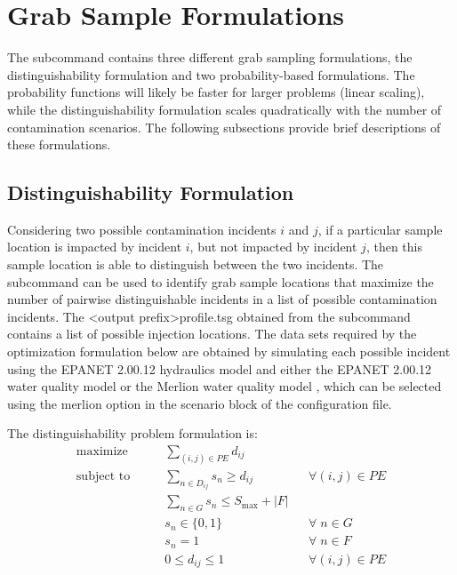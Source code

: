 \section{Grab Sample Formulations}
The  subcommand contains three different grab sampling formulations, 
the distinguishability formulation and two probability-based formulations.
The probability functions will likely be faster for larger problems (linear scaling), while the distinguishability formulation scales quadratically with the number of contamination scenarios. 
The following subsections provide brief descriptions of these formulations.

\subsection{Distinguishability Formulation}
\label{grabsample_formulation}
Considering two possible contamination incidents $i$ and $j$, if a
particular sample location is impacted by incident $i$, but not
impacted by incident $j$, then this sample location is able to
distinguish between the two incidents. The  subcommand
can be used to identify grab sample locations that maximize the number
of pairwise distinguishable incidents in a list of possible
contamination incidents. The <output prefix>profile.tsg obtained
from the  subcommand contains a list of possible injection
locations. The data sets required by the optimization formulation
below are obtained by simulating each possible incident using the
EPANET 2.00.12 hydraulics model and either the EPANET 2.00.12 water quality model or the Merlion water quality model \citep{Mann1},
which can be selected using the merlion option in the scenario block of the configuration file.

The distinguishability problem formulation is:
\begin{align}
\textrm{maximize}\qquad &\sum_{(i,j) \in PE} d_{ij}\label{eqn.grabsample_obj}\\
\textrm{subject to} \qquad &\sum_{n \in D_{ij}}s_n \geq d_{ij} &&\forall \left( i,j \right) \in PE \label{eqn.grabsample_cons1} \\
&\sum_{n \in G}s_n \leq S_{\max} + \left|F\right|\label{eqn.grabsample_cons2} \\
&s_n \in \lbrace 0,1 \rbrace &&\forall \; n \in G \label{eqn.grabsample_cons3}\\
&s_n = 1 &&\forall \; n \in F \label{eqn.grabsample_cons5}\\
&0 \leq d_{ij} \leq 1 &&\forall \left( i,j \right) \in PE \label{eqn.grabsample_cons4}
\end{align}

